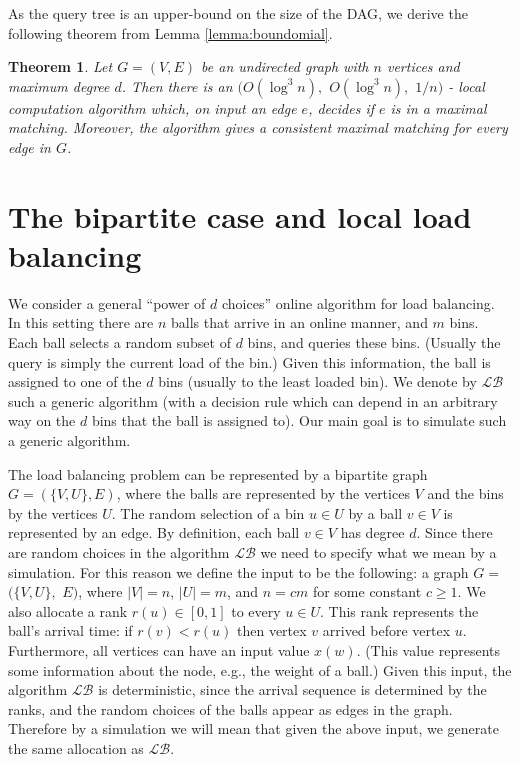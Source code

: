 \documentclass[english, oribibl]{llncs}
\newtheorem{theorem}{Theorem}[section]
\begin{document}
As the query tree is an upper-bound on the size of the DAG,  we derive the following theorem from Lemma \ref{lemma:boundomial}.
\begin{theorem}
\label{thm:maximal}
Let $G=(V,E)$ be an undirected graph with $n$ vertices and maximum degree $d$.
Then there is an 
$(O(\log^{3}{n}), $ $O(\log^{3}{n}), $ $1/n)$ - local computation algorithm 
which, on input an edge $e$, 
decides if $e$ is in a maximal matching.
Moreover, the algorithm gives a consistent maximal matching
for every edge in $G$.
\end{theorem}





\section{The bipartite case and local load balancing}
\label{section:load_balancing}

We consider a general ``power of $d$ choices'' online algorithm for load balancing. In this setting there are $n$ balls that arrive in an online manner, and $m$ bins.
Each ball selects a random subset of $d$ bins, and queries these bins. (Usually the query is simply the current load of the bin.) Given this information, the ball is assigned to one of the $d$ bins (usually to the least loaded bin). We denote by $\mathcal{LB}$ such a generic algorithm (with a decision rule which can depend in an arbitrary way on the $d$ bins that the ball is assigned to). Our main goal is to simulate such a generic algorithm.

The load balancing problem can be represented by a bipartite graph $G = (\{V,U\}, E)$,
where the balls are represented by the vertices $V$ and the bins by the vertices $U$.
The random selection of a bin $u\in U$  by a ball $v\in V$ is represented by an edge.
By definition, each ball $v\in V$ has degree $d$. 
Since there are random choices in the algorithm $\mathcal{LB}$ we need to specify what we mean by a simulation. For this reason we define the input to be the following:
a graph $G =$
 $(\{V, U\},$ $E)$, where $|V| = n $, $|U|=m$, and $n=cm$ for some constant $c\geq 1$. We also allocate a rank $r(u) \in [0,1]$ to every $u \in U$. This rank represents the ball's arrival time: if $r(v)<r(u)$ then vertex $v$ arrived before vertex $u$. Furthermore, all vertices can have an input value $x(w)$. (This value represents some information about the node, e.g., the weight of a ball.)
Given this input, the algorithm $\mathcal{LB}$ is deterministic, since the arrival sequence is determined by the ranks, and the random choices of the balls appear as edges in the graph. Therefore by a simulation we will mean that given the above input, we generate the same allocation as $\mathcal{LB}$.
\end{document}
